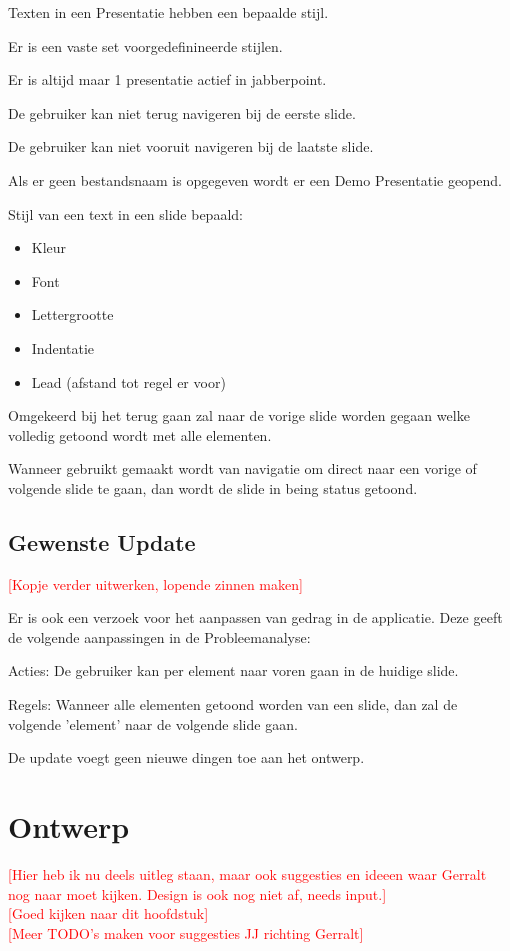 \documentclass[a4paper]{article}
\newcommand{\todo}[1]{\textcolor{red}{[#1]}}
\begin{document}
Texten in een Presentatie hebben een bepaalde stijl.

Er is een vaste set voorgedefinineerde stijlen.

Er is altijd maar 1 presentatie actief in jabberpoint.

De gebruiker kan niet terug navigeren bij de eerste slide.

De gebruiker kan niet vooruit navigeren bij de laatste slide.

Als er geen bestandsnaam is opgegeven wordt er een Demo Presentatie geopend.

Stijl van een text in een slide bepaald:
\begin{itemize}
    \item Kleur
    \item Font
    \item Lettergrootte
    \item Indentatie
    \item Lead (afstand tot regel er voor)
\end{itemize}

Omgekeerd bij het terug gaan zal naar de vorige slide worden gegaan welke
volledig getoond wordt met alle elementen.

Wanneer gebruikt gemaakt wordt van navigatie om direct naar een vorige of
volgende slide te gaan, dan wordt de slide in being status getoond.

\subsection{Gewenste Update}
\todo{Kopje verder uitwerken, lopende zinnen maken}

Er is ook een verzoek voor het aanpassen van gedrag in de applicatie. Deze geeft
de volgende aanpassingen in de Probleemanalyse:

Acties: De gebruiker kan per element naar voren gaan in de huidige slide.

Regels: Wanneer alle elementen getoond worden van een slide, dan zal de volgende
'element' naar de volgende slide gaan.

De update voegt geen nieuwe dingen toe aan het ontwerp.

\section{Ontwerp}
\label{sec:ontwerp}
\todo{Hier heb ik nu deels uitleg staan, maar ook suggesties en ideeen waar
Gerralt nog naar moet kijken. Design is ook nog niet af, needs input.}
\\
\todo{Goed kijken naar dit hoofdstuk}
\\
\todo{Meer TODO's maken voor suggesties JJ richting Gerralt}
\end{document}
